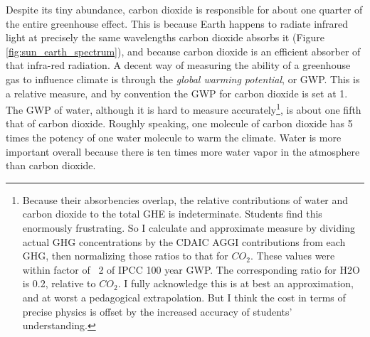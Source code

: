 \documentclass[amstex,12pt]{book}
\begin{document}
Despite its tiny abundance, carbon dioxide is responsible for about one quarter of the entire greenhouse effect. This is because Earth happens to radiate infrared light at precisely the same wavelengths carbon dioxide absorbs it (Figure \ref{fig:sun_earth_spectrum}), and because carbon dioxide is an efficient absorber of that infra-red radiation. A decent way of measuring the ability of a greenhouse gas to influence climate is through the \emph{global warming potential}, or GWP. This is a relative measure, and by convention the GWP for carbon dioxide is set at 1. The GWP of water, although it is hard to measure accurately\footnote{Because their absorbencies overlap, the relative contributions of water and carbon dioxide to the total GHE is indeterminate. Students find this enormously frustrating. So I calculate and approximate measure by dividing actual GHG concentrations by the CDAIC AGGI contributions from each GHG, then normalizing those ratios to that for $CO_2$. These values were within factor of ~2 of IPCC 100 year GWP. The corresponding ratio for H2O is 0.2, relative to $CO_2$. I fully acknowledge this is at best an approximation, and at worst a pedagogical extrapolation. But I think the cost in terms of precise physics is offset by the increased accuracy of students' understanding.}, is about one fifth that of carbon dioxide. Roughly speaking, one molecule of carbon dioxide has 5 times the potency of one water molecule to warm the climate. Water is more important overall because there is ten times more water vapor in the atmosphere than carbon dioxide.\\
\end{document}
